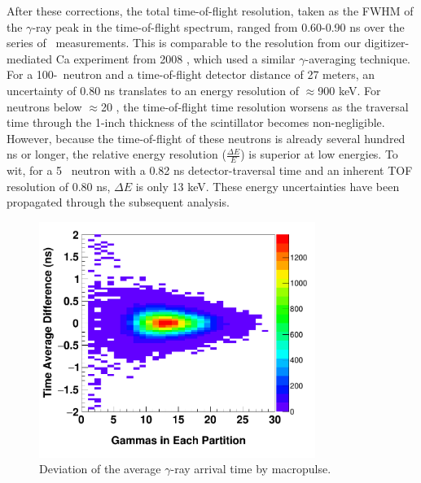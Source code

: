 After these corrections, the total time-of-flight
resolution, taken as the FWHM of the $\gamma$-ray peak in the time-of-flight
spectrum, ranged from 0.60-0.90 ns over the series of \tot\ measurements. This is comparable 
to the resolution from our digitizer-mediated Ca experiment from 2008 \cite{Shane2010},
which used a similar $\gamma$-averaging technique. For a 100-\mega\electronvolt\
neutron and a time-of-flight detector distance of 27 meters, an
uncertainty of 0.80 ns translates to an energy resolution of $\approx$900 keV.
For neutrons below $\approx$20 \mega\electronvolt, the time-of-flight time resolution worsens as the 
traversal time through the 1-inch thickness of the scintillator becomes non-negligible.
However, because the time-of-flight of these neutrons is already several hundred ns or
longer, the relative energy resolution ($\frac{\Delta E}{E}$) is
superior at low energies. To wit, for a 5 \mega\electronvolt\ neutron with a 0.82 ns detector-traversal time and
an inherent TOF resolution of 0.80 ns, $\Delta E$ is only 13 keV. These energy uncertainties
have been propagated through the subsequent analysis.

\begin{figure}[tb]
    \centering
    \includegraphics[width=0.8\textwidth]{figures/gammaCorrection2D.png}
    \caption[Deviation of the average $\gamma$-ray arrival time by macropulse]
    {Deviation of the average $\gamma$-ray arrival time by macropulse. }
    \label{GammaCorrection}
\end{figure}

